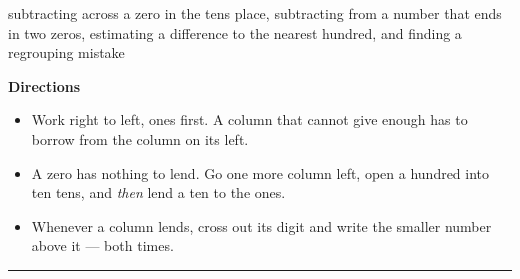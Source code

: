 \documentclass[12pt]{article}
\begin{document}

\begin{center}
\small subtracting across a zero in the tens place, subtracting from a number that ends in two zeros, estimating a difference to the nearest hundred, and finding a regrouping mistake
\end{center}

\noindent\textbf{Directions}
\begin{itemize}[leftmargin=1.1cm, itemsep=1pt, topsep=2pt]
  \item Work right to left, ones first. A column that cannot give enough has to borrow from the column on its left.
  \item A zero has nothing to lend. Go one more column left, open a hundred into ten tens, and \emph{then} lend a ten to the ones.
  \item Whenever a column lends, cross out its digit and write the smaller number above it --- both times.
\end{itemize}

\vspace{0.15cm}
\noindent\rule{\linewidth}{0.4pt}


\end{document}
